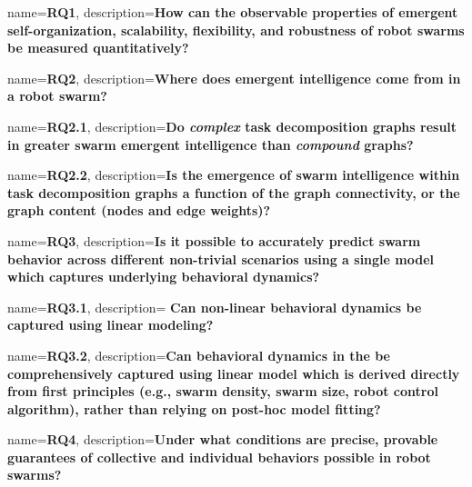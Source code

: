 {
  name={\textbf{RQ1}},
  description={\textbf{How can the observable properties of emergent
      self-organization, scalability, flexibility, and robustness of robot
      swarms be measured quantitatively?}}
}

{
  name={\textbf{RQ2}},
  description={\textbf{Where does emergent intelligence come from in a robot swarm?}}
}

{
  name={\textbf{RQ2.1}},
  description={\textbf{Do \emph{complex} task decomposition graphs result in
      greater swarm emergent intelligence than \emph{compound} graphs?}}
}

{
  name={\textbf{RQ2.2}},
  description={\textbf{Is the emergence of swarm intelligence within task
        decomposition graphs a function of the graph connectivity, or
        the graph content (nodes and edge weights)?}}
}

{
  name={\textbf{RQ3}},
  description={\textbf{Is it possible to accurately predict swarm behavior
      across different non-trivial scenarios using a single model which captures
      underlying behavioral dynamics?}}  }

{
  name={\textbf{RQ3.1}},
  description={ \textbf{Can non-linear behavioral dynamics be captured using
      linear modeling?}  } }

 {
  name={\textbf{RQ3.2}},
  description={\textbf{Can behavioral dynamics in the be
  comprehensively captured using linear model which is derived directly from
  first principles (e.g., swarm density, swarm size, robot control algorithm),
  rather than relying on post-hoc model fitting?}}
}

{
  name={\textbf{RQ4}},
  description={\textbf{Under what conditions are precise, provable guarantees of
      collective and individual behaviors possible in robot swarms?}}
}
